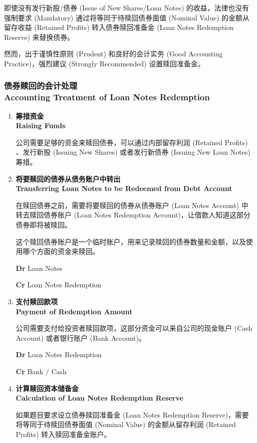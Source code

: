 \documentclass{article}
\begin{document}
\noindent 即使没有发行新股/债券 (Issue of New Shares/Loan Notes) 的收益，法律也没有强制要求 (Mandatory) 通过将等同于待赎回债券面值 (Nominal Value) 的金额从留存收益 (Retained Profits) 转入债券赎回准备金 (Loan Notes Redemption Reserve) 来替换债券。

然而，出于谨慎性原则 (Prudent) 和良好的会计实务 (Good Accounting Practice)，强烈建议 (Strongly Recommended) 设置赎回准备金。

\subsubsection{债券赎回的会计处理\\Accounting Treatment of Loan Notes Redemption}

\begin{enumerate}
    \item \textbf{筹措资金\\Raising Funds}
    
    公司需要足够的资金来赎回债券，可以通过内部留存利润 (Retained Profits) 、发行新股 (Issuing New Shares) 或者发行新债券 (Issuing New Loan Notes) 筹措。

    \item \textbf{将要赎回的债券从债务账户中转出\\Transferring Loan Notes to be Redeemed from Debt Account}

    在赎回债券之前，需要将要赎回的债券从债券账户 (Loan Notes Account) 中转去赎回债券账户 (Loan Notes Redemption Account)，让借款人知道这部分债券即将被赎回。

    这个赎回债券账户是一个临时账户，用来记录赎回的债券数量和金额，以及使用哪个方面的资金来赎回。

    \begin{mdframed}[backgroundcolor=gray!10]
    \textbf{Dr} Loan Notes

    \hspace{1.7em}\textbf{Cr} Loan Notes Redemption
    \end{mdframed}

    \item \textbf{支付赎回款项\\Payment of Redemption Amount}
    
    公司需要支付给投资者赎回款项，这部分资金可以来自公司的现金账户 (Cash Account) 或者银行账户 (Bank Account)。

    \begin{mdframed}[backgroundcolor=gray!10]
    \textbf{Dr} Loan Notes Redemption

    \hspace{1.7em}\textbf{Cr} Bank / Cash
    \end{mdframed}

    \item \textbf{计算赎回资本储备金\\Calculation of Loan Notes Redemption Reserve}
    
    如果题目要求设立债券赎回准备金 (Loan Notes Redemption Reserve)，需要将等同于待赎回债券面值 (Nominal Value) 的金额从留存利润 (Retained Profits) 转入赎回准备金账户。
\end{enumerate}
\end{document}
